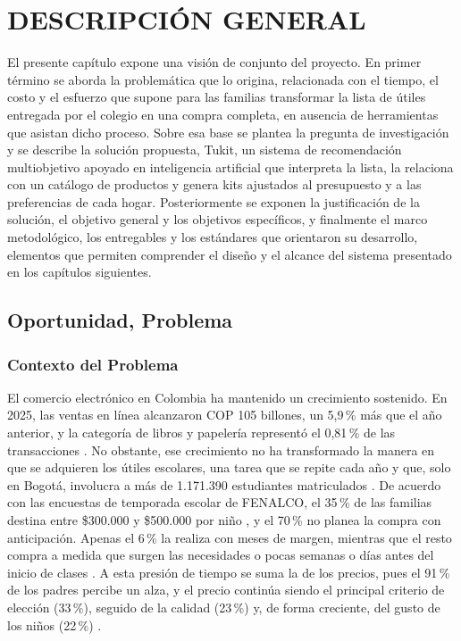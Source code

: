 \setcounter{subsection}{0}
\section{DESCRIPCIÓN GENERAL}

El presente capítulo expone una visión de conjunto del proyecto. En primer término se aborda
la problemática que lo origina, relacionada con el tiempo, el costo y el esfuerzo que supone
para las familias transformar la lista de útiles entregada por el colegio en una compra
completa, en ausencia de herramientas que asistan dicho proceso. Sobre esa base se plantea
la pregunta de investigación y se describe la solución propuesta, Tukit, un sistema de
recomendación multiobjetivo apoyado en inteligencia artificial que interpreta la lista, la
relaciona con un catálogo de productos y genera kits ajustados al presupuesto y a las
preferencias de cada hogar. Posteriormente se exponen la justificación de la solución, el
objetivo general y los objetivos específicos, y finalmente el marco metodológico, los
entregables y los estándares que orientaron su desarrollo, elementos que permiten
comprender el diseño y el alcance del sistema presentado en los capítulos siguientes.\par

\subsection{Oportunidad, Problema}

\subsubsection{Contexto del Problema}

El comercio electrónico en Colombia ha mantenido un crecimiento sostenido. En 2025, las
ventas en línea alcanzaron COP 105 billones, un 5,9\,\% más que el año anterior, y la
categoría de libros y papelería representó el 0,81\,\% de las transacciones
\citep{noauthor_informe_nodate-1}. No obstante, ese crecimiento no ha transformado la manera
en que se adquieren los útiles escolares, una tarea que se repite cada año y que, solo en
Bogotá, involucra a más de 1.171.390 estudiantes matriculados
\citep{noauthor_estadisticas_nodate}. De acuerdo con las encuestas de temporada escolar de
FENALCO, el 35\,\% de las familias destina entre \$300.000 y \$500.000 por niño
\citep{noauthor_resultados_2025}, y el 70\,\% no planea la compra con anticipación. Apenas
el 6\,\% la realiza con meses de margen, mientras que el resto compra a medida que surgen
las necesidades o pocas semanas o días antes del inicio de clases
\citep{noauthor_resultados_2024}. A esta presión de tiempo se suma la de los precios, pues
el 91\,\% de los padres percibe un alza, y el precio continúa siendo el principal criterio
de elección (33\,\%), seguido de la calidad (23\,\%) y, de forma creciente, del gusto de los niños (22\,\%) \citep{noauthor_resultados_2025}.\par

